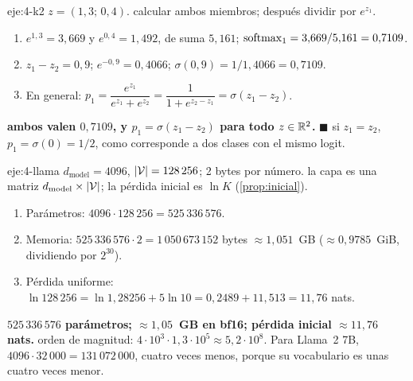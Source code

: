 \begin{solucion}{eje:4-k2}
\datos $z=(1{,}3;\,0{,}4)$.
\planteamiento calcular ambos miembros; después dividir por $e^{z_1}$.
\pasos
\begin{enumerate}[label=\arabic*.]
  \item $e^{1{,}3}=3{,}669$ y $e^{0{,}4}=1{,}492$, de suma $5{,}161$; $\operatorname{softmax}_1=3{,}669/5{,}161=0{,}7109$.
  \item $z_1-z_2=0{,}9$; $e^{-0{,}9}=0{,}4066$; $\sigma(0{,}9)=1/1{,}4066=0{,}7109$.
  \item En general: $p_1=\dfrac{e^{z_1}}{e^{z_1}+e^{z_2}}=\dfrac{1}{1+e^{z_2-z_1}}=\sigma(z_1-z_2)$.
\end{enumerate}
\resultado \textbf{ambos valen $0{,}7109$, y $p_1=\sigma(z_1-z_2)$ para todo $z\in\mathbb{R}^{2}$.} $\blacksquare$
\comprobacion si $z_1=z_2$, $p_1=\sigma(0)=1/2$, como corresponde a dos clases con el mismo logit.
\end{solucion}

\begin{solucion}{eje:4-llama}
\datos $d_{\text{model}}=4096$, $\lvert\mathcal{V}\rvert=128\,256$; 2 bytes por número.
\planteamiento la capa es una matriz $d_{\text{model}}\times\lvert\mathcal{V}\rvert$; la pérdida inicial es $\ln K$ (\cref{prop:inicial}).
\pasos
\begin{enumerate}[label=\arabic*.]
  \item Parámetros: $4096\cdot 128\,256=525\,336\,576$.
  \item Memoria: $525\,336\,576\cdot 2=1\,050\,673\,152$ bytes $\approx 1{,}051$~GB ($\approx 0{,}9785$~GiB, dividiendo por $2^{30}$).
  \item Pérdida uniforme: $\ln 128\,256=\ln 1{,}28256+5\ln 10=0{,}2489+11{,}513=11{,}76$ nats.
\end{enumerate}
\resultado \textbf{$525\,336\,576$ parámetros; $\approx 1{,}05$~GB en bf16; pérdida inicial $\approx 11{,}76$ nats.}
\comprobacion orden de magnitud: $4\cdot 10^{3}\cdot 1{,}3\cdot 10^{5}\approx 5{,}2\cdot 10^{8}$. Para Llama~2 7B, $4096\cdot 32\,000=131\,072\,000$, cuatro veces menos, porque su vocabulario es unas cuatro veces menor.
\end{solucion}

